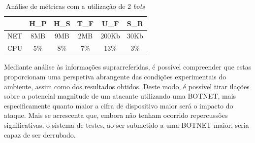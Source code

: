 \begin{table}[!h]
    \renewcommand{\arraystretch}{1.3}
    \caption{Análise de métricas com a utilização de 2 \textit{bots}}
    \label{tab:table-2-bots}
    \centering
    \begin{tabular}{|c|c|c|c|c|c|}
        \hline
            & H\_P & H\_S & T\_F & U\_F  & S\_R \\
        \hline
        NET & 8MB  & 9MB  & 2MB  & 200Kb & 30Kb \\
        \hline
        CPU & 5\%  & 8\%  & 7\%  & 13\%  & 3\%  \\
        \hline
    \end{tabular}
\end{table}

Mediante análise às informações suprarreferidas, é possível compreender que estas proporcionam uma perspetiva abrangente das condições experimentais do ambiente, assim como dos resultados obtidos. Deste modo, é possível tirar ilações sobre a potencial magnitude de um atacante utilizando uma BOTNET, mais especificamente quanto maior a cifra de dispositivo maior será o impacto do ataque. Mais se acrescenta que, embora não tenham ocorrido repercussões significativas, o sistema de testes, ao ser submetido a uma BOTNET maior, seria capaz de ser derrubado.